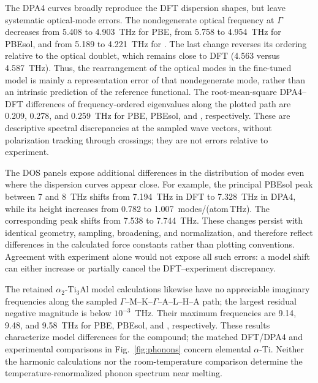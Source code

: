 The DPA4 curves broadly reproduce the DFT dispersion shapes, but leave systematic optical-mode errors.
The nondegenerate optical frequency at $\Gamma$ decreases from 5.408 to 4.903~THz for PBE, from 5.758 to 4.954~THz for PBEsol, and from 5.189 to 4.221~THz for \rscan{}.
The last change reverses its ordering relative to the optical doublet, which remains close to DFT (4.563 versus 4.587~THz).
Thus, the rearrangement of the \rscan{} optical modes in the fine-tuned model is mainly a representation error of that nondegenerate mode, rather than an intrinsic prediction of the reference functional.
The root-mean-square DPA4--DFT differences of frequency-ordered eigenvalues along the plotted path are 0.209, 0.278, and 0.259~THz for PBE, PBEsol, and \rscan{}, respectively.
These are descriptive spectral discrepancies at the sampled wave vectors, without polarization tracking through crossings; they are not errors relative to experiment.

The DOS panels expose additional differences in the distribution of modes even where the dispersion curves appear close.
For example, the principal PBEsol peak between 7 and 8~THz shifts from 7.194~THz in DFT to 7.328~THz in DPA4, while its height increases from 0.782 to 1.007~modes/(atom\,THz).
The corresponding \rscan{} peak shifts from 7.538 to 7.744~THz.
These changes persist with identical geometry, sampling, broadening, and normalization, and therefore reflect differences in the calculated force constants rather than plotting conventions.
Agreement with experiment alone would not expose all such errors: a model shift can either increase or partially cancel the DFT--experiment discrepancy.

The retained $\alpha_2$-Ti$_3$Al model calculations likewise have no appreciable imaginary frequencies along the sampled $\Gamma$--M--K--$\Gamma$--A--L--H--A path; the largest residual negative magnitude is below $10^{-3}$~THz.
Their maximum frequencies are 9.14, 9.48, and 9.58~THz for PBE, PBEsol, and \rscan{}, respectively.
These results characterize model differences for the compound; the matched DFT/DPA4 and experimental comparisons in Fig.~\ref{fig:phonons} concern elemental $\alpha$-Ti.
Neither the harmonic calculations nor the room-temperature comparison determine the temperature-renormalized phonon spectrum near melting.

